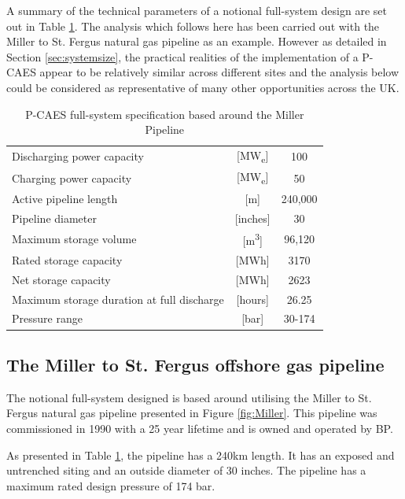 \documentclass[preprint,12pt]{elsarticle}
\begin{document}
A summary of the technical parameters of a notional full-system design are set out in Table \ref{tab:FullSpecification}. The analysis which follows here has been carried out with the Miller to St. Fergus natural gas pipeline as an example. However as detailed in Section \ref{sec:systemsize}, the practical realities of the implementation of a P-CAES appear to be relatively similar across different sites and the analysis below could be considered as representative of many other opportunities across the UK. 

\begin{table}[h]
    \centering
    \begin{tabular}{lcc}
\hline
Discharging power capacity & {[}MW\textsubscript{e}{]} & 100  \\
Charging power capacity & {[}MW\textsubscript{e}{]} & 50 \\
Active pipeline length&  {[}m{]} & 240,000  \\
Pipeline diameter & {[}inches{]} & 30  \\
Maximum storage volume & {[}m\textsuperscript{3}{]} & 96,120  \\
Rated storage capacity & {[}MWh{]} & 3170  \\
Net storage capacity & {[}MWh{]} & 2623  \\
Maximum storage duration at full discharge & {[}hours{]} & 26.25  \\
Pressure range & {[}bar{]} & 30-174  \\
\hline
\end{tabular}
    \caption{P-CAES full-system specification based around the Miller Pipeline}
    \label{tab:FullSpecification}
\end{table}

\subsection{The Miller to St. Fergus offshore gas pipeline}

The notional full-system designed is based around utilising the Miller to St. Fergus natural gas pipeline presented in Figure \ref{fig:Miller}. This pipeline was commissioned in 1990 with a 25 year lifetime and is owned and operated by BP.

As presented in Table \ref{tab:FullSpecification}, the pipeline has a 240km length. It has an exposed and untrenched siting and an outside diameter of 30 inches. The pipeline has a maximum rated design pressure of 174 bar. 
\end{document}
